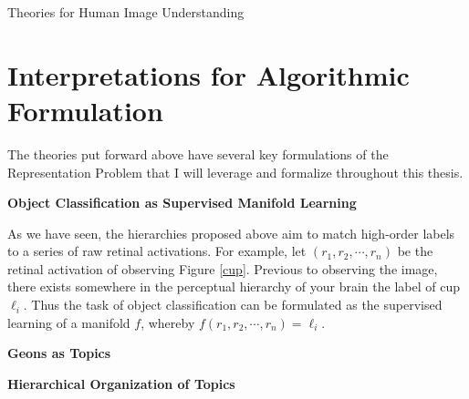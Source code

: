 \documentclass[12pt]{pom_thesis}
\begin{document}
\begin{chapter}{Theories for Human Image Understanding}
\section{Interpretations for Algorithmic Formulation}
\label{interp}
The theories put forward above have several key formulations of the Representation Problem that I will leverage and formalize throughout this thesis. 

\textbf{Object Classification as Supervised Manifold Learning}

As we have seen, the hierarchies proposed above aim to match high-order labels to a series of raw retinal activations. For example, let $(r_1,r_2,\cdots, r_n)$ be the retinal activation of observing Figure \ref{cup}. Previous to observing the image, there exists somewhere in the perceptual hierarchy of your brain the label of cup $\ell_i$. Thus the task of object classification  can be formulated as the supervised learning of a manifold $f$, whereby $f(r_1,r_2,\cdots,r_n) = \ell_i$.

\textbf{Geons as Topics}

\textbf{Hierarchical Organization of Topics}
\end{chapter}
\end{document}
